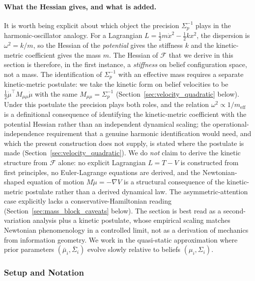 \documentclass[11pt]{article}
\begin{document}
\paragraph{What the Hessian gives, and what is added.} It is worth being explicit about which object the precision $\Sigma_p^{-1}$ plays in the harmonic-oscillator analogy. For a Lagrangian $L = \tfrac12 m \dot{x}^2 - \tfrac12 k x^2$, the dispersion is $\omega^2 = k/m$, so the Hessian of the \emph{potential} gives the stiffness $k$ and the kinetic-metric coefficient gives the mass $m$. The Hessian of $\mathcal{F}$ that we derive in this section is therefore, in the first instance, a \emph{stiffness} on belief configuration space, not a mass. The identification of $\Sigma_p^{-1}$ with an effective mass requires a separate kinetic-metric postulate: we take the kinetic form on belief velocities to be $\tfrac12 \dot{\mu}^\top M_{\mu\mu} \dot{\mu}$ with the same $M_{\mu\mu} = \Sigma_p^{-1}$ (Section~\ref{sec:velocity_quadratic} below). Under this postulate the precision plays both roles, and the relation $\omega^2 \propto 1/m_{\text{eff}}$ is a definitional consequence of identifying the kinetic-metric coefficient with the potential Hessian rather than an independent dynamical scaling; the operational-independence requirement that a genuine harmonic identification would need, and which the present construction does not supply, is stated where the postulate is made (Section~\ref{sec:velocity_quadratic}). We do \emph{not} claim to derive the kinetic structure from $\mathcal{F}$ alone: no explicit Lagrangian $L = T - V$ is constructed from first principles, no Euler-Lagrange equations are derived, and the Newtonian-shaped equation of motion $M\ddot\mu = -\nabla V$ is a structural consequence of the kinetic-metric postulate rather than a derived dynamical law. The asymmetric-attention case explicitly lacks a conservative-Hamiltonian reading (Section~\ref{sec:mass_block_caveats} below). The section is best read as a second-variation analysis plus a kinetic postulate, whose empirical scaling matches Newtonian phenomenology in a controlled limit, not as a derivation of mechanics from information geometry. We work in the quasi-static approximation where prior parameters $(\bar{\mu}_i, \bar{\Sigma}_i)$ evolve slowly relative to beliefs $(\mu_i, \Sigma_i)$.

\subsubsection{Setup and Notation}
\end{document}
